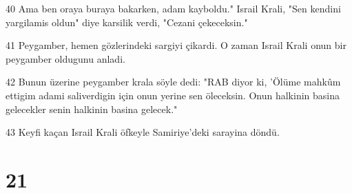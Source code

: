 \par 40 Ama ben oraya buraya bakarken, adam kayboldu." Israil Krali, "Sen kendini yargilamis oldun" diye karsilik verdi, "Cezani çekeceksin."
\par 41 Peygamber, hemen gözlerindeki sargiyi çikardi. O zaman Israil Krali onun bir peygamber oldugunu anladi.
\par 42 Bunun üzerine peygamber krala söyle dedi: "RAB diyor ki, 'Ölüme mahkûm ettigim adami saliverdigin için onun yerine sen öleceksin. Onun halkinin basina gelecekler senin halkinin basina gelecek."
\par 43 Keyfi kaçan Israil Krali öfkeyle Samiriye'deki sarayina döndü.

\chapter{21}

